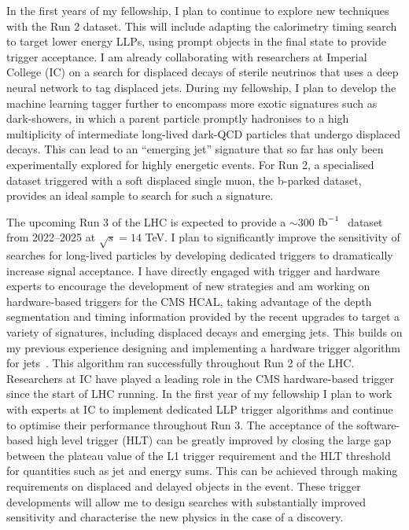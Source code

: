 \documentclass[11pt,a4paper]{article}
\theoremstyle{plain} \numberwithin{equation}{section}
\theoremstyle{definition}
\DeclareRobustCommand{\ifb}{$\rm{fb}^{-1}~$}
\begin{document}
In the first years of my fellowship, I plan to continue to
explore new techniques with the Run 2 dataset. This will include 
adapting the calorimetry timing search
to target lower energy LLPs, using prompt objects
in the final state to provide trigger acceptance. I am already collaborating with 
researchers at Imperial College (IC) on a
search for displaced decays of sterile neutrinos that
uses a deep neural network to tag displaced jets. During my fellowship, I plan to develop
the machine learning tagger further to encompass more exotic signatures such as dark-showers, in
which a parent particle promptly hadronises to a high 
multiplicity of intermediate long-lived dark-QCD particles that undergo displaced decays. 
This can lead to an ``emerging jet'' signature that so far has only
been experimentally explored for highly energetic events. For Run 2, a specialised dataset triggered
with a soft displaced single muon, the b-parked dataset, provides an ideal sample to search for
such a signature.

The upcoming Run 3 of the LHC is expected to provide a $\sim 300$ \ifb
dataset from 2022--2025 at $\sqrt{s} = 14$ TeV. 
I plan to significantly improve the sensitivity
of searches for long-lived particles by developing dedicated triggers to 
dramatically increase signal acceptance.
I have directly engaged with trigger and hardware experts 
to encourage the development of new strategies
and am working on hardware-based triggers for the CMS HCAL, 
taking advantage of the depth segmentation and timing 
information provided by the recent upgrades to target a variety of signatures, 
including displaced decays and emerging jets. This builds on my previous experience 
designing and implementing a hardware trigger algorithm for jets~\cite{Zabi:2016ljo,Kreis:2015jjr}. This algorithm
ran successfully throughout Run 2 of the LHC. Researchers at IC
have played a leading role in the CMS hardware-based trigger since the start of LHC running.
In the first year of my fellowship I plan to work with experts at IC to
implement dedicated LLP trigger algorithms and continue to optimise their performance throughout Run 3. 
The acceptance of the software-based high level trigger (HLT) can be greatly improved by
closing the large gap between the plateau value of the L1 trigger requirement
and the HLT threshold for quantities such as jet and energy sums. This can be achieved through
making requirements on displaced and delayed objects in the event. These trigger developments
will allow me to design searches with substantially improved sensitivity 
and characterise the new physics in
the case of a discovery. 
\end{document}
